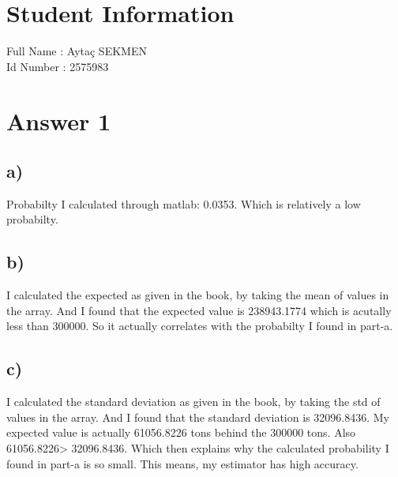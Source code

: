 \documentclass[12pt]{article}
\begin{document}
\section*{Student Information } 
Full Name :  Aytaç SEKMEN\\
Id Number :  2575983\\

\section*{Answer 1}

\subsection*{a)}
Probabilty I calculated through matlab: 0.0353. Which is relatively a low probabilty.

\subsection*{b)}
I calculated the expected as given in the book, by taking the mean of values in the array. And I found that the expected value is 238943.1774 which is acutally less than 300000. So it actually correlates with the probabilty I found in part-a.


\subsection*{c)} 
I calculated the standard deviation as given in the book, by taking the std of values in the array. And I found that the standard deviation is 32096.8436. My expected value is actually 61056.8226 tons behind the 300000 tons. Also 61056.8226> 32096.8436. Which then explains why the calculated probability I found in part-a is so small. This means, my estimator has high accuracy.
\end{document}
